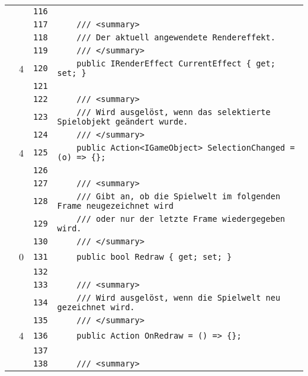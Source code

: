 \documentclass[a4paper,10pt]{article}
\begin{document}
\begin{longtable}[l]{lrrl}
\cellcolor{gray} &  & \verb~116~ & \verb~~\\
\cellcolor{gray} &  & \verb~117~ & \verb~    /// <summary>~\\
\cellcolor{gray} &  & \verb~118~ & \verb~    /// Der aktuell angewendete Rendereffekt.~\\
\cellcolor{gray} &  & \verb~119~ & \verb~    /// </summary>~\\
\cellcolor{green} & 4 & \verb~120~ & \verb~    public IRenderEffect CurrentEffect { get; set; }~\\
\cellcolor{gray} &  & \verb~121~ & \verb~~\\
\cellcolor{gray} &  & \verb~122~ & \verb~    /// <summary>~\\
\cellcolor{gray} &  & \verb~123~ & \verb~    /// Wird ausgelöst, wenn das selektierte Spielobjekt geändert wurde.~\\
\cellcolor{gray} &  & \verb~124~ & \verb~    /// </summary>~\\
\cellcolor{green} & 4 & \verb~125~ & \verb~    public Action<IGameObject> SelectionChanged = (o) => {};~\\
\cellcolor{gray} &  & \verb~126~ & \verb~~\\
\cellcolor{gray} &  & \verb~127~ & \verb~    /// <summary>~\\
\cellcolor{gray} &  & \verb~128~ & \verb~    /// Gibt an, ob die Spielwelt im folgenden Frame neugezeichnet wird~\\
\cellcolor{gray} &  & \verb~129~ & \verb~    /// oder nur der letzte Frame wiedergegeben wird.~\\
\cellcolor{gray} &  & \verb~130~ & \verb~    /// </summary>~\\
\cellcolor{red} & 0 & \verb~131~ & \verb~    public bool Redraw { get; set; }~\\
\cellcolor{gray} &  & \verb~132~ & \verb~~\\
\cellcolor{gray} &  & \verb~133~ & \verb~    /// <summary>~\\
\cellcolor{gray} &  & \verb~134~ & \verb~    /// Wird ausgelöst, wenn die Spielwelt neu gezeichnet wird.~\\
\cellcolor{gray} &  & \verb~135~ & \verb~    /// </summary>~\\
\cellcolor{green} & 4 & \verb~136~ & \verb~    public Action OnRedraw = () => {};~\\
\cellcolor{gray} &  & \verb~137~ & \verb~~\\
\cellcolor{gray} &  & \verb~138~ & \verb~    /// <summary>~\\

\end{longtable}
\end{document}
